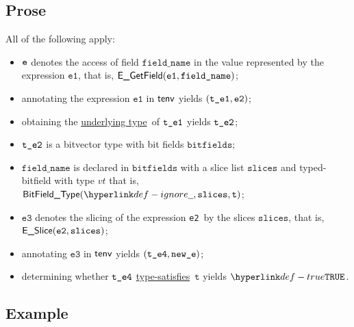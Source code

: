\documentclass{book}
\newcommand\ProseOrTypeError[0]{\ProseTerminateAs{\TypeErrorConfig}}
\newcommand\underlyingtype[0]{\hyperlink{def-underlyingtype}{underlying type}}
\newcommand\typesatisfies[0]{\hyperlink{def-typesatisfies}{type-satisfies}}
\newcommand\vt[0]{\texttt{t}}
\newcommand\veone[0]{\texttt{e1}}
\newcommand\vetwo[0]{\texttt{e2}}
\newcommand\vethree[0]{\texttt{e3}}
\newcommand\bitfields[0]{\texttt{bitfields}}
\newcommand\fieldname[0]{\texttt{field\_name}}
\newcommand\slices[0]{\texttt{slices}}
\newcommand\newe[0]{\texttt{new\_e}}
\begin{document}
\subsection{Prose}
All of the following apply:
\begin{itemize}
  \item $\texttt{e}$ denotes the access of field $\fieldname$ in the value represented by the expression $\veone$, that is, $\EGetField(\veone, \fieldname)$;
  \item annotating the expression $\veone$ in $\textsf{tenv}$ yields $(\vteone, \vetwo)$\ProseOrTypeError;
  \item obtaining the \underlyingtype\ of $\texttt{t\_e1}$ yields $\texttt{t\_e2}$\ProseOrTypeError;
  \item $\texttt{t\_e2}$ is a bitvector type with bit fields $\bitfields$;
  \item $\fieldname$ is declared in $\bitfields$ with a slice list $\slices$ and typed-bitfield with type $vt$ that is,
        $\BitFieldType(\Ignore, \slices, \vt)$;
  \item $\vethree$ denotes the slicing of the expression \vetwo\ by the slices $\slices$, that is, \\ $\ESlice(\vetwo, \slices)$;
  \item annotating $\vethree$ in $\textsf{tenv}$ yields $(\vtefour, \newe)$\ProseOrTypeError;
  \item determining whether $\texttt{t\_e4}$ \typesatisfies\ $\vt$ yields $\True$\ProseOrTypeError.
\end{itemize}

\subsection{Example}

\end{document}
